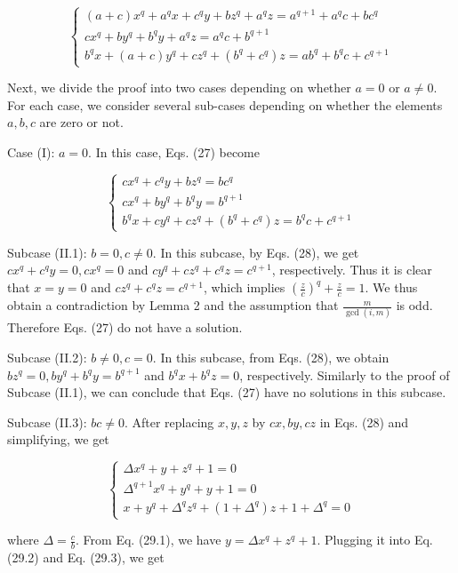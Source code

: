 \documentclass[10pt]{article}
\begin{document}
\[
\left\{\begin{array}{l}
(a+c) x^{q}+a^{q} x+c^{q} y+b z^{q}+a^{q} z=a^{q+1}+a^{q} c+b c^{q}  \tag{27.1}\\
c x^{q}+b y^{q}+b^{q} y+a^{q} z=a^{q} c+b^{q+1} \\
b^{q} x+(a+c) y^{q}+c z^{q}+\left(b^{q}+c^{q}\right) z=a b^{q}+b^{q} c+c^{q+1}
\end{array}\right.
\]

Next, we divide the proof into two cases depending on whether $a=0$ or $a \neq 0$. For each case, we consider several sub-cases depending on whether the elements $a, b, c$ are zero or not.

Case (I): $a=0$. In this case, Eqs. (27) become

\[
\left\{\begin{array}{l}
c x^{q}+c^{q} y+b z^{q}=b c^{q}  \tag{28.1}\\
c x^{q}+b y^{q}+b^{q} y=b^{q+1} \\
b^{q} x+c y^{q}+c z^{q}+\left(b^{q}+c^{q}\right) z=b^{q} c+c^{q+1}
\end{array}\right.
\]

Subcase (II.1): $b=0, c \neq 0$. In this subcase, by Eqs. (28), we get $c x^{q}+c^{q} y=0, c x^{q}=0$ and $c y^{q}+c z^{q}+ c^{q} z=c^{q+1}$, respectively. Thus it is clear that $x=y=0$ and $c z^{q}+c^{q} z=c^{q+1}$, which implies $\left(\frac{z}{c}\right)^{q}+\frac{z}{c}=1$. We thus obtain a contradiction by Lemma 2 and the assumption that $\frac{m}{\operatorname{gcd}(i, m)}$ is odd. Therefore Eqs. (27) do not have a solution.

Subcase (II.2): $b \neq 0, c=0$. In this subcase, from Eqs. (28), we obtain $b z^{q}=0, b y^{q}+b^{q} y=b^{q+1}$ and $b^{q} x+b^{q} z=0$, respectively. Similarly to the proof of Subcase (II.1), we can conclude that Eqs. (27) have no solutions in this subcase.

Subcase (II.3): $b c \neq 0$. After replacing $x, y, z$ by $c x, b y, c z$ in Eqs. (28) and simplifying, we get

\[
\left\{\begin{array}{l}
\Delta x^{q}+y+z^{q}+1=0  \tag{29.1}\\
\Delta^{q+1} x^{q}+y^{q}+y+1=0 \\
x+y^{q}+\Delta^{q} z^{q}+\left(1+\Delta^{q}\right) z+1+\Delta^{q}=0
\end{array}\right.
\]

where $\Delta=\frac{c}{b}$. From Eq. (29.1), we have $y=\Delta x^{q}+z^{q}+1$. Plugging it into Eq. (29.2) and Eq. (29.3), we get
\end{document}
